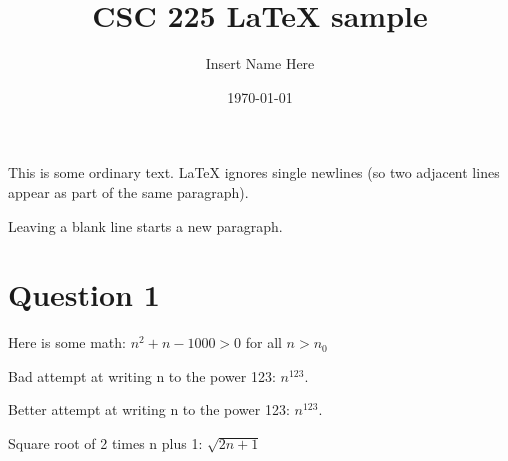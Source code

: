 \documentclass[letterpaper, 12pt]{artikel3}
\title{CSC 225 LaTeX sample}
\date{ \today }
\author{Insert Name Here}
\begin{document}
\maketitle

This is some ordinary text.
LaTeX ignores single newlines (so two adjacent lines appear as part of the same paragraph).

Leaving a blank line starts a new paragraph.


\section*{Question 1}


Here is some math: $n^2 + n - 1000 > 0$ for all $n > n_0$


Bad attempt at writing n to the power 123: $n^123$.


Better attempt at writing n to the power 123: $n^{123}$.


Square root of 2 times n plus 1: $\sqrt{2n + 1}$

\end{document}

